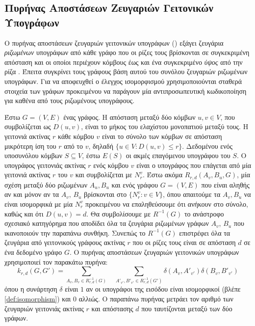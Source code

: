 \subsection{Πυρήνας Αποστάσεων Ζευγαριών Γειτονικών Υπογράφων}
Ο πυρήνας αποστάσεων ζευγαριών γειτονικών υπογράφων () εξάγει ζευγάρια \textit{ριζωμένων} υπογράφων από κάθε γράφο που οι ρίζες τους βρίσκονται σε συγκεκριμένη απόσταση και οι οποίοι περιέχουν κόμβους έως και ένα συγκεκριμένο \textit{ύψος} από την ρίζα \cite{costa2010fast}.
Έπειτα συγκρίνει τους γράφους βάση αυτού του συνόλου ζευγαριών ριζωμένων υπογράφων.
Για να αποφευχθεί ο έλεγχος ισομορφισμού χρησιμοποιούνται σταθερά στοιχεία των γράφων προκειμένου να παράγουν μία αντιπροσωπευτική κωδικοποίηση για καθένα από τους ριζωμένους υπογράφους.\par
Έστω $G=(V,E)$ ένας γράφος.
Η απόσταση μεταξύ δύο κόμβων $u,v \in V$, που συμβολίζεται ως $D(u,v)$, είναι το μήκος του ελαχίστου μονοπατιού μεταξύ τους.
Η γειτονιά ακτίνας $r$ κάθε κόμβου $v$ είναι το σύνολο των κόμβων σε απόσταση μικρότερη ίση του $r$ από το $v$, δηλαδή $\{ u \in V : D(u,v) \leq r\}$.
Δεδομένου ενός υποσυνόλου κόμβων $S \subseteq V$, έστω $E(S)$ οι ακμές επαγόμενου υπογράφου του $S$.
Ο υπογράφος γειτονιάς ακτίνας $r$ ενός κόμβου $v$ είναι ο υπογράφος που επάγεται από μία γειτονιά ακτίνας $r$ του $v$ και συμβολίζεται με $N_r^v$.
Έστω ακόμα $R_{r,d}(A_v,B_u,G)$, μία σχέση μεταξύ δύο ριζωμένων $A_{u}, B_{u}$ και ενός γράφου $G=(V,E)$ που είναι αληθής αν και μόνον αν τα $A_v$, $B_u$ βρίσκονται στο $\{N_r^v : v \in V \}$, όπου απαιτούμε τα $A_v, B_u$ να είναι ισομορφικά με μία $N_r^v$ προκειμένου να επαληθεύσουμε ότι ανήκουν στο σύνολο, καθώς και ότι $D(u,v) = d$.
Θα συμβολίσουμε με $R^{-1}(G)$ το ανάστροφο σχεσιακό κατηγόρημα που αποδίδει όλα τα ζευγάρια ριζωμένων γράφων $A_v$, $B_u$ που ικανοποιούν την παραπάνω συνθήκη.
Συνεπώς το $R^{-1}(G)$ επιστρέφει όλα τα ζευγάρια από γειτονικούς γράφους ακτίνας $r$ που οι ρίζες τους είναι σε απόσταση $d$ σε ένα δεδομένο γράφο $G$.
Ο πυρήνας αποστάσεων ζευγαριών γειτονικών υπογράφων χρησιμοποιεί τον παρακάτω πυρήνα:
\begin{equation}
    k_{r,d}(G, G') = \sum_{A_v, B_v \in R_{r,d}^{-1}(G)} \quad \sum_{A'_{v'}, B'_{v'} \in R_{r,d}^{-1}(G')} \delta(A_v, A'_{v'}) \delta(B_v, B'_{v'})
\end{equation}
όπου η συνάρτηση $\delta$ είναι $1$ αν οι υπογράφοι της εισόδου είναι ισομορφικοί (βλέπε \ref{def:isomorphism}) και $0$ αλλιώς.
Ο παραπάνω πυρήνας μετράει τον αριθμό των ζευγαριών γειτονιάς ακτίνας $r$ και απόστασης $d$ που ταυτίζονται μεταξύ των δύο γράφων.
